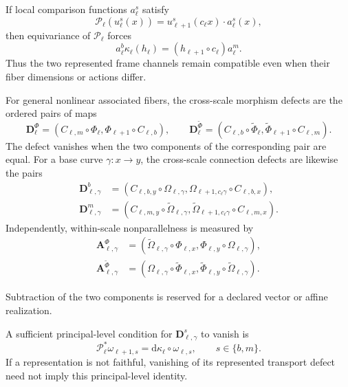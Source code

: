 If local comparison functions
\(a^s_\ell\) satisfy
\[
\mathcal P_\ell(u^s_\ell(x))
=u^s_{\ell+1}(c_\ell x)\cdot a^s_\ell(x),
\]
then equivariance of \(\mathcal P_\ell\) forces
\begin{equation}
a^b_\ell\kappa_\ell(h_\ell)
=(h_{\ell+1}\circ c_\ell)a^m_\ell.
\label{eq:rg-relative-frame-naturality}
\end{equation}
Thus the two represented frame channels remain compatible even when their
fiber dimensions or actions differ. 

For general nonlinear associated fibers, the cross-scale morphism defects are
the ordered pairs of maps
\begin{equation}
\mathbf D^\Phi_\ell
=\left(C_{\ell,m}\circ\Phi_\ell,
\Phi_{\ell+1}\circ C_{\ell,b}\right),\qquad
\mathbf D^{\widetilde\Phi}_\ell
=\left(C_{\ell,b}\circ\widetilde\Phi_\ell,
\widetilde\Phi_{\ell+1}\circ C_{\ell,m}\right).
\label{eq:rg-cross-morphism-defects}
\end{equation}
The defect vanishes when the two components of the corresponding pair are
equal. For a base curve \(\gamma:x\to y\), the cross-scale connection
defects are likewise the pairs
\begin{align}
\mathbf D^b_{\ell,\gamma}
&=\left(C_{\ell,b,y}\circ\Omega_{\ell,\gamma},
\Omega_{\ell+1,c_\ell\gamma}\circ C_{\ell,b,x}\right),\nonumber\\
\mathbf D^m_{\ell,\gamma}
&=\left(C_{\ell,m,y}\circ\widetilde\Omega_{\ell,\gamma},
\widetilde\Omega_{\ell+1,c_\ell\gamma}\circ C_{\ell,m,x}\right).
\label{eq:rg-cross-connection-defects}
\end{align}
Independently, within-scale nonparallelness is measured by
\begin{align}
\mathbf A^\Phi_{\ell,\gamma}
&=\left(\widetilde\Omega_{\ell,\gamma}\circ\Phi_{\ell,x},
\Phi_{\ell,y}\circ\Omega_{\ell,\gamma}\right),\nonumber\\
\mathbf A^{\widetilde\Phi}_{\ell,\gamma}
&=\left(\Omega_{\ell,\gamma}\circ\widetilde\Phi_{\ell,x},
\widetilde\Phi_{\ell,y}\circ\widetilde\Omega_{\ell,\gamma}\right).
\label{eq:rg-within-connection-defects}
\end{align}

Subtraction of the two components is reserved for a declared vector or affine
realization. 

A sufficient principal-level condition for
\(\mathbf D^s_{\ell,\gamma}\) to vanish is
\begin{equation}
\mathcal P_\ell^*\omega_{\ell+1,s}
=\mathrm d\kappa_\ell\circ\omega_{\ell,s},
\qquad s\in\{b,m\}.
\label{eq:rg-principal-connection-naturality}
\end{equation}
If a representation is not faithful, vanishing of its represented transport
defect need not imply this principal-level identity. 

